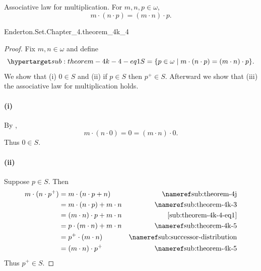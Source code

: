 \documentclass{report}
\begin{document}
\subsection{}%

  \begin{theorem}[4K-4]
    Associative law for multiplication.
    For $m, n, p \in \omega$, $$m \cdot (n \cdot p) = (m \cdot n) \cdot p.$$
  \end{theorem}

    {Enderton.Set.Chapter\_4.theorem\_4k\_4}


  \begin{proof}

    Fix $m, n \in \omega$ and define
      \begin{equation}
        \hyperlabel{sub:theorem-4k-4-eq1}
        S = \{p \in \omega \mid m \cdot (n \cdot p) = (m \cdot n) \cdot p\}.
      \end{equation}
    We show that (i) $0 \in S$ and (ii) if $p \in S$ then $p^+ \in S$.
    Afterward we show that (iii) the associative law for multiplication holds.

    \paragraph{(i)}%

      By ,
        $$m \cdot (n \cdot 0) = 0 = (m \cdot n) \cdot 0.$$
      Thus $0 \in S$.

    \paragraph{(ii)}%

      Suppose $p \in S$.
      Then
        \begin{align*}
          m \cdot (n \cdot p^+)
            & = m \cdot (n \cdot p + n) & \textref{sub:theorem-4j} \\
            & = m \cdot (n \cdot p) + m \cdot n & \textref{sub:theorem-4k-3} \\
            & = (m \cdot n) \cdot p + m \cdot n & \eqref{sub:theorem-4k-4-eq1} \\
            & = p \cdot (m \cdot n) + m \cdot n & \textref{sub:theorem-4k-5} \\
            & = p^+ \cdot (m \cdot n) & \textref{sub:successor-distribution} \\
            & = (m \cdot n) \cdot p^+ & \textref{sub:theorem-4k-5}
        \end{align*}
      Thus $p^+ \in S$.


\end{proof}
\end{document}
